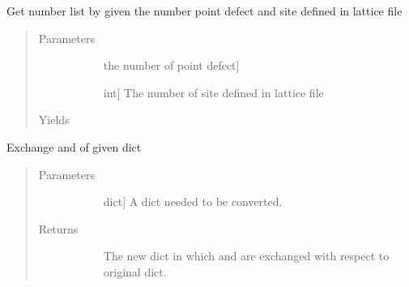 \documentclass[letterpaper,10pt,english]{sphinxmanual}
\begin{document}
\begin{fulllineitems}
\label{\detokenize{pygace:pygace.utility.get_num_lis}}
Get number list by given the number point defect and site defined in
lattice file
\begin{quote}\begin{description}
\item[{Parameters}] \leavevmode\begin{description}
\item[{}] \leavevmode{[}the number of point defect{]}
\item[{}] \leavevmode{[}int{]}
The number of site defined in lattice file

\end{description}

\item[{Yields}] \leavevmode\begin{description}
\item[{}] \leavevmode
\end{description}

\end{description}\end{quote}

\end{fulllineitems}


\begin{fulllineitems}
\label{\detokenize{pygace:pygace.utility.reverse_dict}}
Exchange  and  of given dict
\begin{quote}\begin{description}
\item[{Parameters}] \leavevmode\begin{description}
\item[{}] \leavevmode{[}dict{]}
A dict needed to be converted.

\end{description}

\item[{Returns}] \leavevmode\begin{description}
\item[{}] \leavevmode
The new dict in which  and  are exchanged with respect to
original dict.

\end{description}

\end{description}\end{quote}

\end{fulllineitems}
\end{document}
